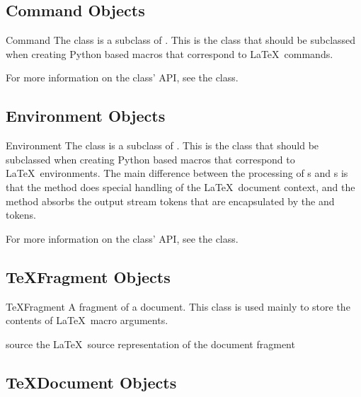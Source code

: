 \subsection{Command Objects}

\begin{classdesc}{Command}{}
The  class is a subclass of .  This is the class
that should be subclassed when creating Python based macros that correspond
to \LaTeX\ commands.

For more information on the  class' API, see the 
 class.
\end{classdesc}


\subsection{Environment Objects}

\begin{classdesc}{Environment}{}
The  class is a subclass of .  This is the
class that should be subclassed when creating Python based macros that 
correspond to \LaTeX\ environments.  The main difference between the 
processing of s and s is that the
 method does special handling of the \LaTeX\ document
context, and the  method absorbs the output stream tokens
that are encapsulated by the  and  tokens. 

For more information on the  class' API, see the 
 class.
\end{classdesc}


\subsection{TeXFragment Objects}

\begin{classdesc}{TeXFragment}{}
A fragment of a document.  This class is used mainly to store the contents
of \LaTeX\ macro arguments.
\end{classdesc}

\begin{memberdesc}[TeXFragment]{source}
the \LaTeX\ source representation of the document fragment
\end{memberdesc}


\subsection{TeXDocument Objects}

